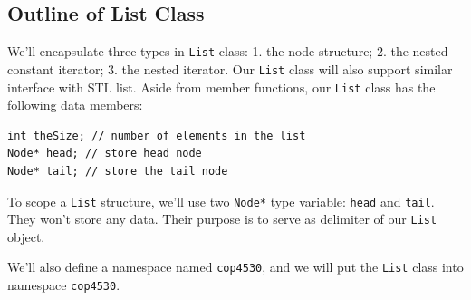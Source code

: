 \documentclass[11pt]{book}
\begin{document}
\subsection{Outline of List Class}
\label{sec:org7b4e22f}
We'll encapsulate three types in \texttt{List} class: 1. the node structure; 2. the nested constant iterator; 3. the nested iterator. Our \texttt{List} class will also support similar interface with STL list. Aside from member functions, our \texttt{List} class has the following data members:
\begin{verbatim}
int theSize; // number of elements in the list
Node* head; // store head node
Node* tail; // store the tail node
\end{verbatim}

To scope a \texttt{List} structure, we'll use two \texttt{Node*} type variable: \texttt{head} and \texttt{tail}. They won't store any data. Their purpose is to serve as delimiter of our \texttt{List} object.

We'll also define a namespace named \texttt{cop4530}, and we will put the \texttt{List} class into namespace \texttt{cop4530}.
\end{document}
